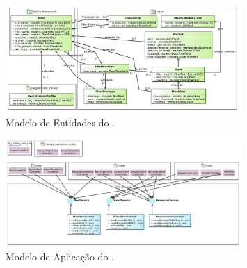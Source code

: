 
\begin{figure}[H]
	\centering
	\includegraphics[width=0.8\textwidth]{figuras/FrameWebEntityModel.jpg}
	\caption{Modelo de Entidades do \imprimirtitulo.}
	\label{fig:ent}
\end{figure}

\begin{figure}[H]
	\centering
	\includegraphics[width=0.8\textwidth]{figuras/FrameWebApplicationModel.jpg}
	\caption{Modelo de Aplicação do \imprimirtitulo.}
	\label{fig:apl}
\end{figure}




%
